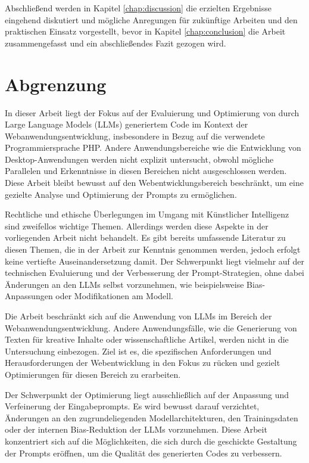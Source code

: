 Abschließend werden in Kapitel \ref{chap:discussion} die erzielten Ergebnisse eingehend diskutiert und mögliche Anregungen für zukünftige Arbeiten und den praktischen Einsatz vorgestellt, bevor in Kapitel \ref{chap:conclusion} die Arbeit zusammengefasst und ein abschließendes Fazit gezogen wird.



\section{Abgrenzung}
In dieser Arbeit liegt der Fokus auf der Evaluierung und Optimierung von durch Large Language Models (LLMs) generiertem Code im Kontext der Webanwendungsentwicklung, insbesondere in Bezug auf die verwendete Programmiersprache PHP. Andere Anwendungsbereiche wie die Entwicklung von Desktop-Anwendungen werden nicht explizit untersucht, obwohl mögliche Parallelen und Erkenntnisse in diesen Bereichen nicht ausgeschlossen werden. Diese Arbeit bleibt bewusst auf den Webentwicklungsbereich beschränkt, um eine gezielte Analyse und Optimierung der Prompts zu ermöglichen.\vspace{0.2cm}

Rechtliche und ethische Überlegungen im Umgang mit Künstlicher Intelligenz sind zweifellos wichtige Themen. Allerdings werden diese Aspekte in der vorliegenden Arbeit nicht behandelt. Es gibt bereits umfassende Literatur zu diesen Themen, die in der Arbeit zur Kenntnis genommen werden, jedoch erfolgt keine vertiefte Auseinandersetzung damit. Der Schwerpunkt liegt vielmehr auf der technischen Evaluierung und der Verbesserung der Prompt-Strategien, ohne dabei Änderungen an den LLMs selbst vorzunehmen, wie beispielsweise Bias-Anpassungen oder Modifikationen am Modell.\vspace{0.2cm}

Die Arbeit beschränkt sich auf die Anwendung von LLMs im Bereich der Webanwendungsentwicklung. Andere Anwendungsfälle, wie die Generierung von Texten für kreative Inhalte oder wissenschaftliche Artikel, werden nicht in die Untersuchung einbezogen. Ziel ist es, die spezifischen Anforderungen und Herausforderungen der Webentwicklung in den Fokus zu rücken und gezielt Optimierungen für diesen Bereich zu erarbeiten.\vspace{0.2cm}

Der Schwerpunkt der Optimierung liegt ausschließlich auf der Anpassung und Verfeinerung der Eingabeprompts. Es wird bewusst darauf verzichtet, Änderungen an den zugrundeliegenden Modellarchitekturen, den Trainingsdaten oder der internen Bias-Reduktion der LLMs vorzunehmen. Diese Arbeit konzentriert sich auf die Möglichkeiten, die sich durch die geschickte Gestaltung der Prompts eröffnen, um die Qualität des generierten Codes zu verbessern.\vspace{0.2cm}

